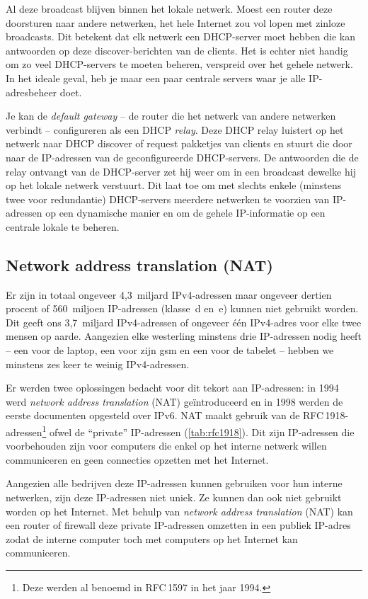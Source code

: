 Al deze broadcast blijven binnen het lokale netwerk.
Moest een router deze doorsturen naar andere netwerken, het hele Internet zou vol lopen met zinloze broadcasts.
Dit betekent dat elk netwerk een DHCP-server moet hebben die kan antwoorden op deze discover-berichten van de clients.
Het is echter niet handig om zo veel DHCP-servers te moeten beheren, verspreid over het gehele netwerk.
In het ideale geval, heb je maar een paar centrale servers waar je alle IP-adresbeheer doet.

Je kan de \emph{default gateway} -- de router die het netwerk van andere netwerken verbindt -- configureren als een DHCP \emph{relay}.
Deze DHCP relay luistert op het netwerk naar DHCP discover of request pakketjes van clients en stuurt die door naar de IP-adressen van de geconfigureerde DHCP-servers.
De antwoorden die de relay ontvangt van de DHCP-server zet hij weer om in een broadcast dewelke hij op het lokale netwerk verstuurt.
Dit laat toe om met slechts enkele (minstens twee voor redundantie) DHCP-servers meerdere netwerken te voorzien van IP-adressen op een dynamische manier en om de gehele IP-informatie op een centrale lokale te beheren.




\subsection{Network address translation (NAT)}
Er zijn in totaal ongeveer 4,3~miljard IPv4-adressen maar ongeveer dertien procent of 560~miljoen IP-adressen (klasse~d en~e) kunnen niet gebruikt worden.
Dit geeft ons 3,7~miljard IPv4-adressen of ongeveer één IPv4-adres voor elke twee mensen op aarde.
Aangezien elke westerling minstens drie IP-adressen nodig heeft -- een voor de laptop, een voor zijn gsm en een voor de tabelet -- hebben we minstens zes keer te weinig IPv4-adressen.

Er werden twee oplossingen bedacht voor dit tekort aan IP-adressen:
in 1994 werd \emph{network address translation} (NAT) geïntroduceerd en in 1998 werden de eerste documenten opgesteld over IPv6.
NAT maakt gebruik van de RFC\,1918-adressen\footnote{Deze werden al benoemd in RFC\,1597 in het jaar 1994.} ofwel de ``private'' IP-adressen (\vref{tab:rfc1918}).
Dit zijn IP-adressen die voorbehouden zijn voor computers die enkel op het interne netwerk willen communiceren en geen connecties opzetten met het Internet.

Aangezien alle bedrijven deze IP-adressen kunnen gebruiken voor hun interne netwerken, zijn deze IP-adressen niet uniek.
Ze kunnen dan ook niet gebruikt worden op het Internet.
Met behulp van \emph{network address translation} (NAT) kan een router of firewall deze private IP-adressen omzetten in een publiek IP-adres zodat de interne computer toch met computers op het Internet kan communiceren.


